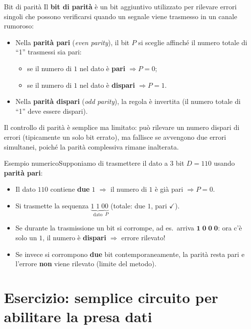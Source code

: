 \begin{definizione}{Bit di parità}
Il \textbf{bit di parità} è un bit aggiuntivo utilizzato per rilevare errori singoli che possono verificarsi quando un segnale viene trasmesso in un canale rumoroso:
\begin{itemize}[leftmargin=1.3em]
    \item Nella \textbf{parità pari} (\emph{even parity}), il bit $P$ si sceglie affinché il numero totale di ``1'' trasmessi sia pari:
    \begin{itemize}
        \item se il numero di $1$ nel dato è \textbf{pari} $\Rightarrow P = 0$;
        \item se il numero di $1$ nel dato è \textbf{dispari} $\Rightarrow P = 1$.
    \end{itemize}
    \item Nella \textbf{parità dispari} (\emph{odd parity}), la regola è invertita (il numero totale di ``1'' deve essere dispari).
\end{itemize}
Il controllo di parità è semplice ma limitato: può rilevare un numero dispari di errori (tipicamente un solo bit errato), ma fallisce se avvengono due errori simultanei, poiché la parità complessiva rimane inalterata.
\end{definizione}

\medskip
\begin{esercizio}{Esempio numerico}Supponiamo di trasmettere il dato a 3 bit $D = 110$ usando \textbf{parità pari}:
\begin{itemize}[leftmargin=1.5em]
    \item Il dato $110$ contiene \textbf{due} $1$ $\Rightarrow$ il numero di $1$ è già pari $\Rightarrow P = 0$.
    \item Si trasmette la sequenza $\underbrace{1\;1\;0}_{\text{dato}}\underbrace{0}_{P}$ (totale: due $1$, pari $\checkmark$).
    \item Se durante la trasmissione un bit si corrompe, ad es.\ arriva $\mathbf{1\;0\;0\;0}$: ora c'è solo un $1$, il numero è \textbf{dispari} $\Rightarrow$ errore rilevato!
    \item Se invece si corrompono \textbf{due} bit contemporaneamente, la parità resta pari e l'errore \textbf{non} viene rilevato (limite del metodo).
\end{itemize}
\end{esercizio}

\section{Esercizio: semplice circuito per abilitare la presa dati}

